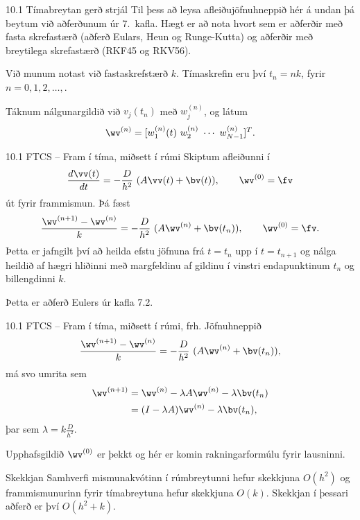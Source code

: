 \begin{frame}{10.1 Tímabreytan gerð strjál}
Til þess að leysa afleiðujöfnuhneppið hér á undan þá beytum við aðferðunum
úr 7.~kafla. Hægt er að nota hvort sem er aðferðir með fasta skrefastærð
(aðferð Eulars, Heun og Runge-Kutta) og aðferðir með breytilega skrefastærð
(RKF45 og RKV56). \pause

\medskip
Við munum notast við fastaskrefstærð $k$. Tímaskrefin eru því
$t_n = n k$, fyrir $n=0,1,2,\ldots,$. \pause

\medskip
Táknum nálgunargildið við 
$v_j(t_n)$ með $w_j^{(n)}$, og látum
$$
  \wv^{(n)} = [w_1^{(n)}(t) \ w_2^{(n)} \ \cdots \ w_{N-1}^{(n)} ]^T. 
$$

\end{frame}

\begin{frame}{10.1 FTCS -- Fram í tíma, miðsett í rúmi}
Skiptum afleiðunni í 
$$ 
 \frac{d \vv(t)}{d t} =  -\frac{D}{h^2}\  (A\vv(t) + \bv(t)), \qquad \wv^{(0)}=\fv
$$
út fyrir frammismun. Þá fæst
$$ 
 \frac{\wv^{(n+1)} - \wv^{(n)}}{ k} =  -\frac{D}{h^2}\  (A\wv^{(n)} + \bv(t_n)), 
 \qquad \wv^{(0)}=\fv.
$$\pause
Þetta er jafngilt því að heilda efstu jöfnuna frá $t=t_n$ upp í $t=t_{n+1}$ og
nálga heildið af hægri hliðinni með margfeldinu af gildinu í vinstri endapunktinum 
$t_n$ og billengdinni $k$. \pause

Þetta er aðferð Eulers úr kafla 7.2.
\end{frame}
 

\begin{frame}{10.1 FTCS -- Fram í tíma, miðsett í rúmi, frh.}
 Jöfnuhneppið
 $$ 
 \frac{\wv^{(n+1)} - \wv^{(n)}}{ k} =  -\frac{D}{h^2}\  (A\wv^{(n)} + \bv(t_n)), 
$$
má svo umrita sem
\begin{align*}
 \wv^{(n+1)} &= \wv^{(n)} -\lambda A\wv^{(n)} - \lambda \bv(t_n) \\
 & = (I-\lambda A) \wv^{(n)} - \lambda \bv(t_n),
\end{align*}
þar sem $\lambda = k\frac{D}{h^2}$. \pause
 
 Upphafsgildið $\wv^{(0)}$ er þekkt og hér er komin rakningarformúlu
 fyrir lausninni.  \pause
 
 \begin{block}{Skekkjan}
  Samhverfi mismunakvótinn í rúmbreytunni hefur skekkjuna
 $O(h^2)$ og frammismunurinn fyrir tímabreytuna hefur skekkjuna $O(k)$. 
 Skekkjan í þessari aðferð er því $O(h^2 + k)$.
 \end{block}
\end{frame}
 
